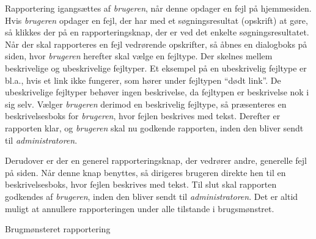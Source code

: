 {Rapportering igangsættes af \textit{brugeren}, når denne opdager en fejl på hjemmesiden. Hvis \textit{brugeren} opdager en fejl, der har med et søgningsresultat (opskrift) at gøre, så klikkes der på en rapporteringsknap, der er ved det enkelte søgningsresultatet. Når der skal rapporteres en fejl vedrørende opskrifter, så åbnes en dialogboks på siden, hvor \textit{brugeren} herefter skal vælge en fejltype. Der skelnes mellem beskrivelige og ubeskrivelige fejltyper. Et eksempel på en ubeskrivelig fejltype er bl.a., hvis et link ikke fungerer, som hører under fejltypen “dødt link”. De ubeskrivelige fejltyper behøver ingen beskrivelse, da fejltypen er beskrivelse nok i sig selv. Vælger \textit{brugeren} derimod en beskrivelig fejltype, så præsenteres en beskrivelsesboks for \textit{brugeren}, hvor fejlen beskrives med tekst. Derefter er rapporten klar, og \textit{brugeren} skal nu godkende rapporten, inden den bliver sendt til \textit{administratoren}.

Derudover er der en generel rapporteringsknap, der vedrører andre, generelle fejl på siden. Når denne knap benyttes, så dirigeres brugeren direkte hen til en beskrivelsesboks, hvor fejlen beskrives med tekst. Til slut skal rapporten godkendes af \textit{brugeren}, inden den bliver sendt til \textit{administratoren}. Det er altid muligt at annullere rapporteringen under alle tilstande i brugsmønstret.}
{}
{}
{Brugmønsteret rapportering}